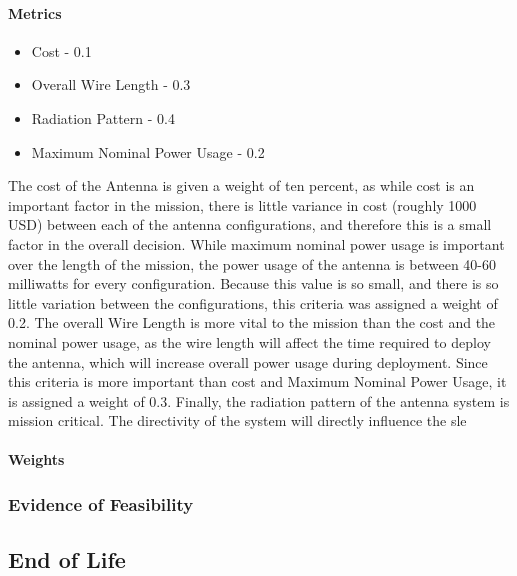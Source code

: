 \paragraph{Metrics}
\begin{itemize}
    \item Cost - 0.1
    \item Overall Wire Length - 0.3
    \item Radiation Pattern - 0.4
    \item Maximum Nominal Power Usage - 0.2
\end{itemize}

The cost of the Antenna is given a weight of ten percent, as while cost is an important factor in the mission, there is little variance in cost (roughly 1000 USD) between each of the antenna configurations, and therefore this is a small factor in the overall decision. While maximum nominal power usage is important over the length of the mission, the power usage of the antenna is between 40-60 milliwatts for every configuration. Because this value is so small, and there is so little variation between the configurations, this criteria was assigned a weight of 0.2. The overall Wire Length is more vital to the mission than the cost and the nominal power usage, as the wire length will affect the time required to deploy the antenna, which will increase overall power usage during deployment. Since this criteria is more important than cost and Maximum Nominal Power Usage, it is assigned a weight of 0.3. Finally, the radiation pattern of the antenna system is mission critical. The directivity of the system will directly influence the sle
\paragraph{Weights}
\subsubsection{Evidence of Feasibility}

\subsection{End of Life}
